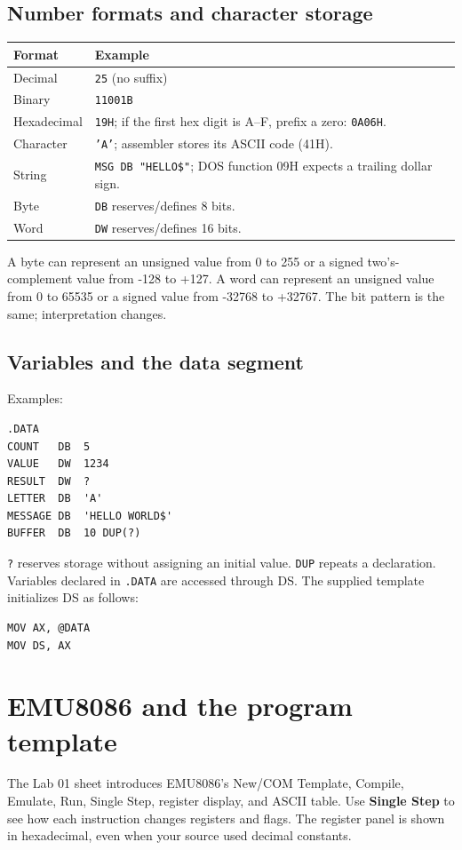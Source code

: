 \documentclass[11pt,a4paper]{article}
\begin{document}
\subsection{Number formats and character storage}
\begin{tabularx}{\linewidth}{lX}
\toprule \textbf{Format} & \textbf{Example}\\
\midrule
Decimal & \texttt{25} (no suffix)\\
Binary & \texttt{11001B}\\
Hexadecimal & \texttt{19H}; if the first hex digit is A--F, prefix a zero: \texttt{0A06H}.\\
Character & \texttt{'A'}; assembler stores its ASCII code (41H).\\
String & \texttt{MSG DB "HELLO\$"}; DOS function 09H expects a trailing dollar sign.\\
Byte & \texttt{DB} reserves/defines 8 bits.\\
Word & \texttt{DW} reserves/defines 16 bits.\\
\bottomrule
\end{tabularx}
A byte can represent an unsigned value from 0 to 255 or a signed two's-complement value from -128 to +127. A word can represent an unsigned value from 0 to 65535 or a signed value from -32768 to +32767. The bit pattern is the same; interpretation changes.

\subsection{Variables and the data segment}
Examples:
\begin{lstlisting}[style=asm]
.DATA
COUNT   DB  5
VALUE   DW  1234
RESULT  DW  ?
LETTER  DB  'A'
MESSAGE DB  'HELLO WORLD$'
BUFFER  DB  10 DUP(?)
\end{lstlisting}
\texttt{?} reserves storage without assigning an initial value. \texttt{DUP} repeats a declaration. Variables declared in \texttt{.DATA} are accessed through DS. The supplied template initializes DS as follows:
\begin{lstlisting}[style=asm]
MOV AX, @DATA
MOV DS, AX
\end{lstlisting}

\section{EMU8086 and the program template}
The Lab 01 sheet introduces EMU8086's New/COM Template, Compile, Emulate, Run, Single Step, register display, and ASCII table. Use \textbf{Single Step} to see how each instruction changes registers and flags. The register panel is shown in hexadecimal, even when your source used decimal constants.
\end{document}
